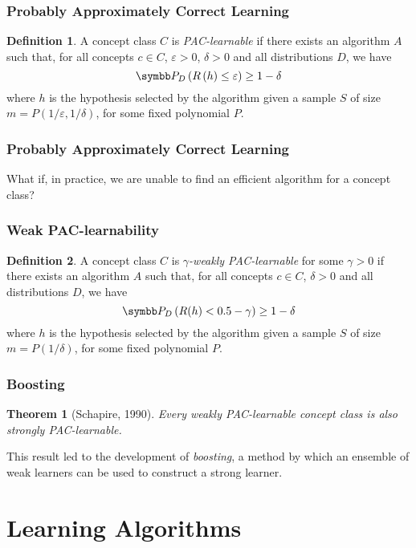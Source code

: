 \documentclass{beamer}
\newtheorem*{theorem*}{Theorem}
\theoremstyle{definition}
\newtheorem*{definition*}{Definition}
\begin{document}
\begin{frame}
\frametitle{Probably Approximately Correct Learning}

\begin{definition*}
A concept class \(C\) is \emph{PAC-learnable} if there exists an algorithm \(A\) such that, for all concepts \(c \in C\), \(\varepsilon > 0\), \(\delta > 0\) and all distributions \(D\), we have
\[
    \probability_{D} \left(R\left(h\right) \leq \varepsilon\right) \geq 1 - \delta
\]
where \(h\) is the hypothesis selected by the algorithm given a sample \(S\) of size \(m = P\left(1/\varepsilon, 1/\delta\right)\), for some fixed polynomial \(P\).
\end{definition*}
\end{frame}

\begin{frame}
\frametitle{Probably Approximately Correct Learning}

What if, in practice, we are unable to find an efficient algorithm for a concept class?
\end{frame}

\begin{frame}
\frametitle{Weak PAC-learnability}

\begin{definition*}
A concept class \(C\) is \emph{\(\gamma\)-weakly PAC-learnable} for some \(\gamma > 0\) if there exists an algorithm \(A\) such that, for all concepts \(c \in C\), \(\delta > 0\) and all distributions \(D\), we have
\[
    \probability_D \left(R(h) < 0.5 - \gamma\right) \geq 1 - \delta
\]
where \(h\) is the hypothesis selected by the algorithm given a sample \(S\) of size \(m = P(1/\delta)\), for some fixed polynomial \(P\).
\end{definition*}
\end{frame}

\begin{frame}
\frametitle{Boosting}

\begin{theorem*}[Schapire, 1990]
Every weakly PAC-learnable concept class is also strongly PAC-learnable.
\end{theorem*}

This result led to the development of \emph{boosting}, a method by which an ensemble of weak learners can be used to construct a strong learner.
\end{frame}

\section{Learning Algorithms}
\end{document}
